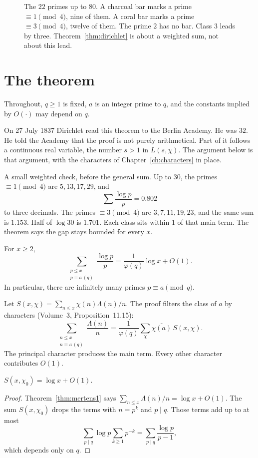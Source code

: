 \begin{figure}[ht]
\centering
{}
\caption{The $22$ primes up to $80$. A charcoal bar marks a prime $\equiv1\pmod4$, nine of them. A coral bar marks a prime $\equiv3\pmod4$, twelve of them. The prime $2$ has no bar. Class $3$ leads by three. Theorem~\ref{thm:dirichlet} is about a weighted sum, not about this lead.}
\label{fig:primesmod4}
\end{figure}

\section{The theorem}

Throughout, $q\ge1$ is fixed, $a$ is an integer prime to $q$, and the constants implied by $O(\cdot)$ may depend on $q$.

On 27 July 1837 Dirichlet read this theorem to the Berlin Academy. He was $32$. He told the Academy that the proof is not purely arithmetical. Part of it follows a continuous real variable, the number $s>1$ in $L(s,\chi)$. The argument below is that argument, with the characters of Chapter~\ref{ch:characters} in place.

A small weighted check, before the general sum. Up to $30$, the primes $\equiv1\pmod4$ are $5,13,17,29$, and
\[
\sum\frac{\log p}p=0.802
\]
to three decimals. The primes $\equiv3\pmod4$ are $3,7,11,19,23$, and the same sum is $1.153$. Half of $\log 30$ is $1.701$. Each class sits within $1$ of that main term. The theorem says the gap stays bounded for every $x$.

\begin{theorem}[Dirichlet, 1837]\label{thm:dirichlet}
For $x\ge2$,
\[
\sum_{\substack{p\le x\\p\equiv a\,(q)}}\frac{\log p}p=\frac1{\varphi(q)}\log x+O(1).
\]
In particular, there are infinitely many primes $p\equiv a\pmod q$.
\end{theorem}

Let $S(x,\chi)=\sum_{n\le x}\chi(n)\Lambda(n)/n$. The proof filters the class of $a$ by characters (Volume~3, Proposition~11.15):
\[
\sum_{\substack{n\le x\\n\equiv a\,(q)}}\frac{\Lambda(n)}n=\frac1{\varphi(q)}\sum_\chi\overline{\chi(a)}\,S(x,\chi).
\]
The principal character produces the main term. Every other character contributes $O(1)$.

\begin{lemma}\label{lem:principal}
$S(x,\chi_0)=\log x+O(1)$.
\end{lemma}
\begin{proof}
Theorem~\ref{thm:mertens1} says $\sum_{n\le x}\Lambda(n)/n=\log x+O(1)$. The sum $S(x,\chi_0)$ drops the terms with $n=p^k$ and $p\mid q$. Those terms add up to at most
\[
\sum_{p\mid q}\log p\sum_{k\ge1}p^{-k}=\sum_{p\mid q}\frac{\log p}{p-1},
\]
which depends only on $q$.
\end{proof}

